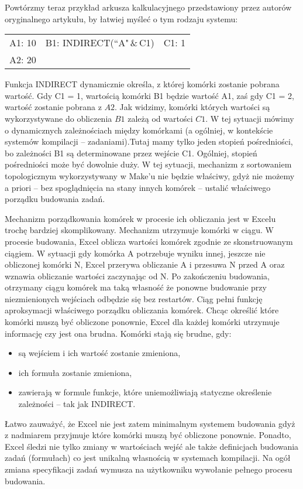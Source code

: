 Powtórzmy teraz przykład arkusza kalkulacyjnego przedstawiony przez autorów oryginalnego artykułu, by łatwiej myśleć o tym rodzaju systemu:

\begin{tabular}{ l c r }
  A1: 10 & B1: INDIRECT(``A"\,\&\,C1) & C1: 1 \\
  A2: 20 & &
\end{tabular}

Funkcja INDIRECT dynamicznie określa, z której komórki zostanie pobrana wartość. Gdy C1 = 1, wartością komórki B1 będzie wartość A1, zaś gdy C1 = 2, wartość zostanie pobrana z \(A2\). Jak widzimy, komórki których wartości są wykorzystywane do obliczenia \(B1\) zależą od wartości \(C1\). W tej sytuacji mówimy o dynamicznych zależnościach między komórkami (a ogólniej, w kontekście systemów kompilacji -- zadaniami).Tutaj mamy tylko jeden stopień pośredniości, bo zależności B1 są determinowane przez wejście C1. Ogólniej, stopień pośredniości może być dowolnie duży. W tej sytuacji, mechanizm z sortowaniem topologicznym wykorzystywany w Make'u nie będzie właściwy, gdyż nie możemy a priori -- bez spoglądnięcia na stany innych komórek -- ustalić właściwego porządku budowania zadań.

Mechanizm porządkowania komórek w procesie ich obliczania jest w Excelu trochę bardziej skomplikowany. Mechanizm utrzymuje komórki w ciągu. W procesie budowania, Excel oblicza wartości komórek zgodnie ze skonstruowanym ciągiem. W sytuacji gdy komórka A potrzebuje wyniku innej, jeszcze nie obliczonej komórki N, Excel przerywa obliczanie A i przesuwa N przed A oraz wznawia obliczanie wartości zaczynając od N. Po zakończeniu budowania, otrzymany ciągu komórek ma taką własność że ponowne budowanie przy niezmienionych wejściach odbędzie się bez restartów. Ciąg pełni funkcję aproksymacji właściwego porządku obliczania komórek. Chcąc określić które komórki muszą być obliczone ponownie, Excel dla każdej komórki utrzymuje informację czy jest ona brudna. Komórki stają się brudne, gdy:
\begin{itemize}
\item są wejściem i ich wartość zostanie zmieniona,
\item ich formuła zostanie zmieniona,
\item zawierają w formule funkcje, które uniemożliwiają statyczne określenie zależności -- tak jak INDIRECT.
\end{itemize}

Łatwo zauważyć, że Excel nie jest zatem minimalnym systemem budowania gdyż z nadmiarem przyjmuje które komórki muszą być obliczone ponownie. Ponadto, Excel śledzi nie tylko zmiany w wartościach wejść ale także definicjach budowania zadań (formułach) co jest unikalną własnością w systemach kompilacji. Na ogół zmiana specyfikacji zadań wymusza na użytkowniku wywołanie pełnego procesu budowania.


